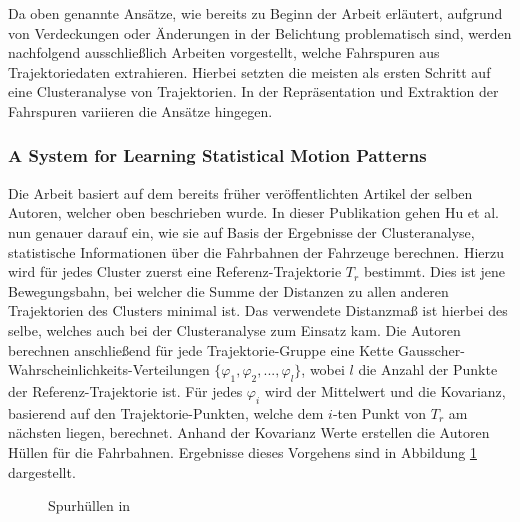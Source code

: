 Da oben genannte Ansätze, wie bereits zu Beginn der Arbeit erläutert, aufgrund von Verdeckungen oder Änderungen
in der Belichtung problematisch sind, werden nachfolgend ausschließlich Arbeiten vorgestellt, welche Fahrspuren
aus Trajektoriedaten extrahieren. Hierbei setzten die meisten als ersten Schritt auf eine Clusteranalyse von Trajektorien.
In der Repräsentation und Extraktion der Fahrspuren variieren die Ansätze hingegen.


\subsubsection*{A System for Learning Statistical Motion Patterns}
Die Arbeit \cite[]{WeimingHu2006} basiert auf dem bereits früher veröffentlichten Artikel \cite[]{Hu2005} der selben Autoren,
welcher oben beschrieben wurde. In dieser Publikation gehen Hu et al. nun genauer darauf ein, wie sie auf Basis
der Ergebnisse der Clusteranalyse, statistische Informationen über die Fahrbahnen der Fahrzeuge berechnen.
Hierzu wird für jedes Cluster zuerst eine Referenz-Trajektorie $T_r$ bestimmt. Dies ist jene Bewegungsbahn,
bei welcher die Summe der Distanzen zu allen anderen Trajektorien des Clusters minimal ist. Das verwendete
Distanzmaß ist hierbei des selbe, welches auch bei der Clusteranalyse zum Einsatz kam.
Die Autoren berechnen anschließend für jede Trajektorie-Gruppe eine Kette Gausscher-Wahrscheinlichkeits-Verteilungen
$\{ \varphi_1, \varphi_2, ..., \varphi_l \}$, wobei $l$ die Anzahl der Punkte der Referenz-Trajektorie ist.
Für jedes $\varphi_i$ wird der Mittelwert und die Kovarianz, basierend auf den Trajektorie-Punkten, welche dem
$i$-ten Punkt von $T_r$ am nächsten liegen, berechnet.
Anhand der Kovarianz Werte erstellen die Autoren Hüllen für die Fahrbahnen. Ergebnisse dieses Vorgehens sind in
Abbildung \ref{fig:relw_hu_example_envelope} dargestellt.

\begin{figure}[H]
    \centering
    \caption[Spurhüllen in Hu et al., 2006]{Spurhüllen in \cite[]{WeimingHu2006}}
    \label{fig:relw_hu_example_envelope}
\end{figure}


